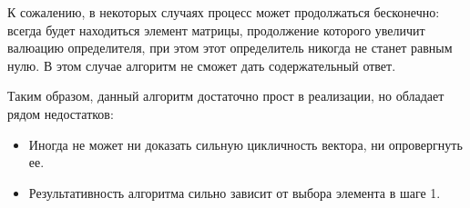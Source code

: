 К сожалению, в некоторых случаях процесс может продолжаться бесконечно:
всегда будет находиться элемент матрицы, продолжение которого увеличит валюацию определителя,
при этом этот определитель никогда не станет равным нулю.
В этом случае алгоритм не сможет дать содержательный ответ.

Таким образом, данный алгоритм достаточно прост в реализации, но обладает рядом недостатков:
\begin{itemize}
    \item
        Иногда не может ни доказать сильную цикличность вектора, ни опровергнуть ее.
    \item
        Результативность алгоритма сильно зависит от выбора элемента в шаге 1.
\end{itemize}
